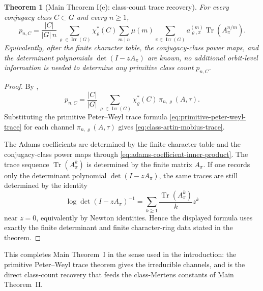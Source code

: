 \documentclass[11pt,a4paper]{amsart}
\theoremstyle{plain}
\newtheorem{theorem}{Theorem}[section]
\theoremstyle{definition}
\theoremstyle{remark}
\DeclareMathOperator{\Tr}{Tr}
\DeclareMathOperator{\Irr}{Irr}
\begin{document}
\begin{theorem}[Main Theorem I(e): class-count trace recovery]
  \label{thm:class-count-trace-recovery}
  \label{thm:class-count-trace-readout}
  \label{cor:class-artin-mobius-trace}
  For every conjugacy class \(C\subset G\) and every \(n\ge 1\),
  \begin{equation}\label{eq:class-artin-mobius-trace}
    p_{n,C}
    =
    \frac{|C|}{|G|\,n}
      \sum_{\varrho\in\Irr(G)}
        \chi_\varrho^\ast(C)
        \sum_{m\mid n}\mu(m)
          \sum_{\pi\in\Irr(G)}
            a_{\varrho,\pi}^{(m)}
            \Tr(A_\pi^{n/m}).
  \end{equation}
  Equivalently, after the finite character table, the conjugacy-class
  power maps, and the determinant polynomials \(\det(I-zA_\pi)\) are
  known, no additional orbit-level information is needed to determine
  any primitive class count \(p_{n,C}\).
\end{theorem}

\begin{proof}
  By ,
  \[
    p_{n,C}
    =
    \frac{|C|}{|G|}
      \sum_{\varrho\in\Irr(G)}
        \chi_\varrho^\ast(C)\,\pi_{n,\varrho}(A,\tau).
  \]
  Substituting the primitive Peter--Weyl trace formula
  \eqref{eq:primitive-peter-weyl-trace} for each channel
  \(\pi_{n,\varrho}(A,\tau)\) gives
  \eqref{eq:class-artin-mobius-trace}.

  The Adams coefficients are determined by the finite character table and
  the conjugacy-class power maps through
  \eqref{eq:adams-coefficient-inner-product}. The trace sequence
  \(\Tr(A_\pi^k)\) is determined by the finite matrix \(A_\pi\). If one
  records only the determinant polynomial \(\det(I-zA_\pi)\), the same
  traces are still determined by the identity
  \[
    \log\det(I-zA_\pi)^{-1}
    =
    \sum_{k\ge1}\frac{\Tr(A_\pi^k)}{k}z^k
  \]
  near \(z=0\), equivalently by Newton identities. Hence the displayed
  formula uses exactly the finite determinant and finite character-ring
  data stated in the theorem.
\end{proof}

\noindent
This completes Main Theorem~I in the sense used in the introduction:
the primitive Peter--Weyl trace theorem gives the irreducible channels,
and  is the direct class-count
recovery that feeds the class-Mertens constants of Main Theorem~II.
\end{document}
